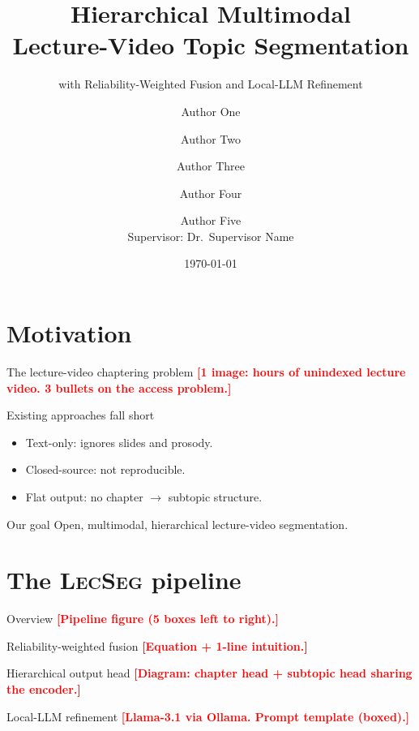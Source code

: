 \documentclass[aspectratio=169]{beamer}
\title{Hierarchical Multimodal\\Lecture-Video Topic Segmentation}
\subtitle{with Reliability-Weighted Fusion and Local-LLM Refinement}
\author{Author One \and Author Two \and Author Three \and Author Four \and Author Five\\
        Supervisor: Dr.\ Supervisor Name}
\institute{Department of CSE, BRAC University}
\date{\today}
\newcommand{\lecseg}{\textsc{LecSeg}}
\newcommand{\todo}[1]{\textcolor{red}{\textbf{[#1]}}}
\begin{document}
\maketitle

\section{Motivation}
\begin{frame}{The lecture-video chaptering problem}
  \todo{1 image: hours of unindexed lecture video. 3 bullets on the access
  problem.}
\end{frame}

\begin{frame}{Existing approaches fall short}
  \begin{itemize}
    \item Text-only: ignores slides and prosody.
    \item Closed-source: not reproducible.
    \item Flat output: no chapter $\to$ subtopic structure.
  \end{itemize}
  \pause
  \begin{block}{Our goal}
    Open, multimodal, hierarchical lecture-video segmentation.
  \end{block}
\end{frame}

\section{The \lecseg{} pipeline}
\begin{frame}{Overview}
  \todo{Pipeline figure (5 boxes left to right).}
\end{frame}

\begin{frame}{Reliability-weighted fusion}
  \todo{Equation + 1-line intuition.}
\end{frame}

\begin{frame}{Hierarchical output head}
  \todo{Diagram: chapter head + subtopic head sharing the encoder.}
\end{frame}

\begin{frame}{Local-LLM refinement}
  \todo{Llama-3.1 via Ollama. Prompt template (boxed).}
\end{frame}

\end{document}
